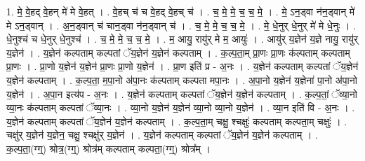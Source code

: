 \documentclass[17pt]{extarticle}
\begin{document}
1. मे॒ वे॒हद् वे॒हन् मे॑ मे वे॒हत् । . वे॒हच् च॑ च वे॒हद् वे॒हच् च॑ । . च॒ मे॒ मे॒ च॒ च॒ मे॒ । . मे॒ ऽन॒ड्वा न॑न॒ड्वान् मे॑ मे ऽन॒ड्वान् । . अ॒न॒ड्वान् च॑ चान॒ड्वा न॑न॒ड्वान् च॑ । . च॒ मे॒ मे॒ च॒ च॒ मे॒ । . मे॒ धे॒नुर् धे॒नुर् मे॑ मे धे॒नुः । . धे॒नुश्च॑ च धे॒नुर् धे॒नुश्च॑ । . च॒ मे॒ मे॒ च॒ च॒ मे॒ । . म॒ आयु॒ रायु॑र् मे म॒ आयुः॑ । . आयु॑र् य॒ज्ञेन॑ य॒ज्ञे नायु॒ रायु॑र् य॒ज्ञेन॑ । . य॒ज्ञेन॑ कल्पताम् कल्पतां ॅय॒ज्ञेन॑ य॒ज्ञेन॑ कल्पताम् । . क॒ल्प॒ता॒म् प्रा॒णः प्रा॒णः क॑ल्पताम् कल्पताम् प्रा॒णः । . प्रा॒णो य॒ज्ञेन॑ य॒ज्ञेन॑ प्रा॒णः प्रा॒णो य॒ज्ञेन॑ । . प्रा॒ण इति॑ प्र - अ॒नः । . य॒ज्ञेन॑ कल्पताम् कल्पतां ॅय॒ज्ञेन॑ य॒ज्ञेन॑ कल्पताम् । . क॒ल्प॒ता॒ म॒पा॒नो अ॑पा॒नः क॑ल्पताम् कल्पता मपा॒नः । . अ॒पा॒नो य॒ज्ञेन॑ य॒ज्ञेना॑ पा॒नो अ॑पा॒नो य॒ज्ञेन॑ । . अ॒पा॒न इत्य॑प - अ॒नः । . य॒ज्ञेन॑ कल्पताम् कल्पतां ॅय॒ज्ञेन॑ य॒ज्ञेन॑ कल्पताम् । . क॒ल्प॒तां॒ ॅव्या॒नो व्या॒नः क॑ल्पताम् कल्पतां ॅव्या॒नः । . व्या॒नो य॒ज्ञेन॑ य॒ज्ञेन॑ व्या॒नो व्या॒नो य॒ज्ञेन॑ । . व्या॒न इति॑ वि - अ॒नः । . य॒ज्ञेन॑ कल्पताम् कल्पतां ॅय॒ज्ञेन॑ य॒ज्ञेन॑ कल्पताम् । . क॒ल्प॒ता॒म् चक्षु॒ श्चक्षुः॑ कल्पताम् कल्पता॒म् चक्षुः॑ । . चक्षु॑र् य॒ज्ञेन॑ य॒ज्ञेन॒ चक्षु॒ श्चक्षु॑र् य॒ज्ञेन॑ । . य॒ज्ञेन॑ कल्पताम् कल्पतां ॅय॒ज्ञेन॑ य॒ज्ञेन॑ कल्पताम् । . क॒ल्प॒ता॒(ग्ग्॒) श्रोत्र॒(ग्ग्॒) श्रोत्र॑म् कल्पताम् कल्पता॒(ग्ग्॒) श्रोत्र᳚म् । \newline
\end{document}
